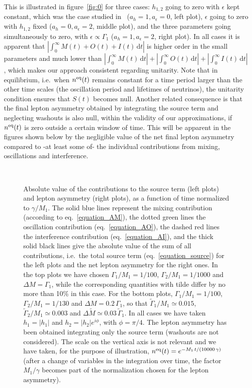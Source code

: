 \documentclass[11pt,a4paper]{article}
\providecommand{\dif}[0]{\mathrm{d}}
\providecommand{\abs}[1]{\left\lvert #1 \right\rvert}
\providecommand{\pia}[0]{\tilde{\Gamma}_1}
\providecommand{\pib}[0]{\tilde{\Gamma}_2}
\begin{document}
This is illustrated in figure~\ref{fig:0} for three cases: $h_{1,2}$ going to zero with $\epsilon$ kept constant, which was the case studied in~\cite{Racker20} ($a_h=1, a_\epsilon=0$, left plot), $\epsilon$ going to zero with $h_{1,2}$ fixed ($a_h=0, a_\epsilon=2$, middle plot), and the three parameters going simultaneously to zero, with $\epsilon \propto \Gamma_{1}$ ($a_h=1, a_\epsilon=2$, right plot). In all cases it is apparent that $\abs{\int_0^\infty M(t) + O(t) + I(t)  \, \dif t}$ is higher order in the small parameters and much lower than $\abs{\int_0^\infty  M(t) \, \dif t} + \abs{\int_0^\infty  O(t) \, \dif t} + \abs{\int_0^\infty  I(t) \, \dif t}$, which makes our approach consistent regarding unitarity. Note that in equilibrium, i.e.~when $n^{\rm eq}(t)$ remains constant for a time period larger than the other time scales (the oscillation period and lifetimes of neutrinos), the unitarity condition ensures that $S(t)$ becomes null. Another related consequence is that the final lepton asymmetry obtained by integrating the source term and neglecting washouts is also null, within the validity of our approximations, if $n^{\rm eq}(t)$ is zero outside a certain window of time. This will be apparent in the figures shown below by the negligible value of the net final lepton asymmetry compared to -at least some of- the individual contributions from mixing, oscillations and interference.


\begin{figure}[!t]
\centerline{\protect\hbox{
}} 
\caption[]{Absolute value of the contributions to the source term (left plots) and lepton asymmetry (right plots), as a function of time normalized to $\gamma/M_1$. The solid blue lines represent the mixing contribution (according to eq.~\eqref{equation_AM}), the dotted green lines the oscillation contribution (eq.~\eqref{equation_AO}), the dashed red lines the interference contribution (eq.~\eqref{equation_AI}), and the thick solid black lines give the absolute value of the sum of all contributions, i.e.~the total source term (eq.~\eqref{equation_source}) for the left plots and the net lepton asymmetry for the right ones. In the top plots we have chosen $\Gamma_1/M_1=1/100$, $\Gamma_2/M_1=1/1000$ and $\Delta M=\Gamma_1$, while the corresponding quantities with tilde differ by no more than 10\% in this case. For the bottom plots, $\Gamma_1/M_1=1/100$, $\Gamma_2/M_1=1/130$ and $\Delta M=0.2 \, \Gamma_1$, so that $\pia/M_1\simeq 0.015$, $\pib/M_1 \simeq 0.003$ and $\Delta {\tilde M} \simeq 0.03 \,\pia$. In all cases we have taken $h_1=\abs{h_1}$ and $h_2=\abs{h_2} e^{i \phi}$, with $\phi=\pi/4$. The lepton asymmetry has been obtained integrating only the source term (washouts are not considered). The scale on the vertical axis is not relevant and we have taken, for the purpose of illustration, $n^{\rm eq}(t)=e^{-M_1 \, t/(10000 \, \gamma)}$ (after a change of variables in the integration over time, the factor $M_1/\gamma$ becomes part of the normalization chosen for the lepton asymmetry).} 
\label{fig:1}
\end{figure}
\end{document}
